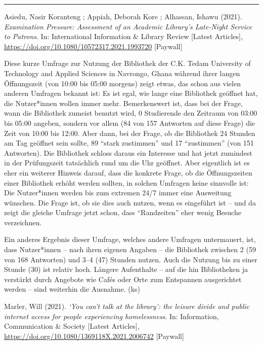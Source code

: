 \documentclass[a4paper,
fontsize=11pt,
oneside,
numbers=noperiodatend,
parskip=half-,
bibliography=totoc,
final
]{scrartcl}
\begin{document}
\begin{center}\rule{0.5\linewidth}{0.5pt}\end{center}

Asiedu, Nasir Koranteng ; Appiah, Deborah Kore ; Alhassan, Ishawu
(2021). \emph{Examination Pressure: Assessment of an Academic Library's
Late-Night Service to Patrons}. In: International Information \& Library
Review {[}Latest Articles{]},
\url{https://doi.org/10.1080/10572317.2021.1993720} {[}Paywall{]}

Diese kurze Umfrage zur Nutzung der Bibliothek der C.K. Tedam University
of Technology and Applied Sciences in Navrongo, Ghana während ihrer
langen Öffnungszeit (von 10:00 bis 05:00 morgens) zeigt etwas, das schon
aus vielen anderen Umfragen bekannt ist: Es ist egal, wie lange eine
Bibliothek geöffnet hat, die Nutzer*innen wollen immer mehr.
Bemerkenswert ist, dass bei der Frage, wann die Bibliothek zumeist
benutzt wird, 0 Studierende den Zeitraum von 03:00 bis 05:00 angeben,
sondern vor allem (84 von 157 Antworten auf diese Frage) die Zeit von
10:00 bis 12:00. Aber dann, bei der Frage, ob die Bibliothek 24 Stunden
am Tag geöffnet sein sollte, 89 \enquote{stark zustimmen} und 17
\enquote{zustimmen} (von 151 Antworten). Die Bibliothek schloss daraus
ein Interesse und hat jetzt zumindest in der Prüfungszeit tatsächlich
rund um die Uhr geöffnet. Aber eigentlich ist es eher ein weiterer
Hinweis darauf, dass die konkrete Frage, ob die Öffnungszeiten einer
Bibliothek erhöht werden sollten, in solchen Umfragen keine sinnvolle
ist: Die Nutzer*innen werden bis zum extremen 24/7 immer eine Ausweitung
wünschen. Die Frage ist, ob sie dies auch nutzen, wenn es eingeführt ist
-- und da zeigt die gleiche Umfrage jetzt schon, dass
\enquote{Randzeiten} eher wenig Besuche verzeichnen.

Ein anderes Ergebnis dieser Umfrage, welches andere Umfragen
untermauert, ist, dass Nutzer*innen -- nach ihren eigenen Angaben -- die
Bibliothek zwischen 2 (59 von 168 Antworten) und 3--4 (47) Stunden
nutzen. Auch die Nutzung bis zu einer Stunde (30) ist relativ hoch.
Längere Aufenthalte -- auf die hin Bibliotheken ja verstärkt durch
Angebote wie Cafés oder Orte zum Entspannen ausgerichtet werden -- sind
weiterhin die Ausnahme. (ks)

Marler, Will (2021). \emph{\enquote*{You can't talk at the library}: the
leisure divide and public internet access for people experiencing
homelessness}. In: Information, Communication \& Society {[}Latest
Articles{]}, \url{https://doi.org/10.1080/1369118X.2021.2006742}
{[}Paywall{]}
\end{document}
